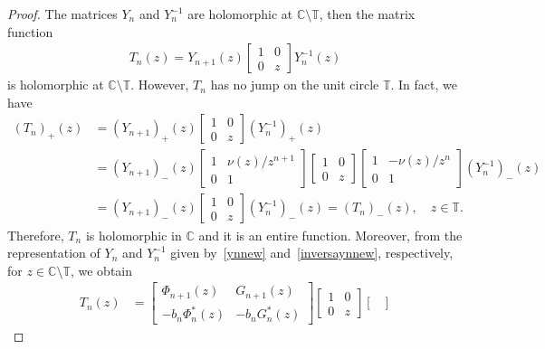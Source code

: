 \documentclass[10pt,a4paper]{amsart}
\begin{document}
\begin{proof} The matrices \( Y_n \) and \( Y_n^{-1} \) are holomorphic at \( \mathbb{C}\setminus\mathbb{T} \), then
the matrix function
\begin{align*}
T_n(z)
=
Y_{n+1}(z)
 \begin{bmatrix}
1 & 0\\
0 & z
\end{bmatrix} 
Y_n^{-1}(z)
\end{align*}
 is holomorphic at \( \mathbb{C}\setminus\mathbb{T} \). 
However, \( T_n \) has no jump on the unit circle \( \mathbb{T} \). In fact, we have
\begin{align*}
 (T_n)_{+}(z) &=(Y_{n+1})_{+}(z)\begin{bmatrix}
1 & 0\\
0 & z
\end{bmatrix}(Y_n^{-1})_{+}(z)\\
 &= {(Y_{n+1})}_{-}(z)
\begin{bmatrix}
1 & \nu(z)/z^{n+1}\\
0 & 1
\end{bmatrix} \begin{bmatrix}
1 & 0\\
0 & z
\end{bmatrix}
\begin{bmatrix}
1 & -\nu(z)/z^{n}\\
0 & 1
\end{bmatrix} {(Y_{n}^{-1})}_{-}(z)\\
 &= {(Y_{n+1})}_{-}(z)
 \begin{bmatrix}
1 & 0\\
0 & z
\end{bmatrix}
 {(Y_{n}^{-1})}_{-}(z) = (T_n)_{-}(z), \quad z\in\mathbb{T}.
\end{align*}
Therefore, \( T_n \) is holomorphic in \( \mathbb{C} \) and it is an entire function.
Moreover, from the representation of \( Y_n \) and \( Y_n^{-1} \) given by~\eqref{ynnew} and~\eqref{inversaynnew}, respectively,
for \( z\in \mathbb C \setminus \mathbb{T} \), we obtain
\begin{align*}
 T_n(z) 
 &=\begin{bmatrix}
\Phi_{n+1}(z) & G_{n+1}(z) \\[.05cm]
-b_{n}\Phi^*_{n}(z) & -b_{n} G^*_{n}(z)
\end{bmatrix}
\begin{bmatrix}
1 & 0\\[.05cm]
0 & z
\end{bmatrix}
\begin{bmatrix}

\end{bmatrix}
\end{align*}
\end{proof}
\end{document}
